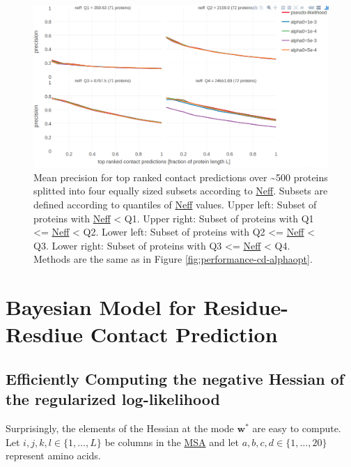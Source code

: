 \documentclass[12pt,a4paper,twoside]{book}
\newcommand{\w}{\mathbf{w}}
\theoremstyle{definition}
\theoremstyle{definition}
\theoremstyle{remark}
\begin{document}
\begin{figure}

{\centering \includegraphics[width=0.9\linewidth]{img/full_likelihood/alpha_opt_precision_vs_rank_facetted_by_neff_notitle} 

}

\caption{Mean precision for top ranked
contact predictions over \textasciitilde{}500 proteins splitted into
four equally sized subsets according to
\protect\hyperlink{abbrev}{Neff}. Subsets are defined according to
quantiles of \protect\hyperlink{abbrev}{Neff} values. Upper left: Subset
of proteins with \protect\hyperlink{abbrev}{Neff} \textless{} Q1. Upper
right: Subset of proteins with Q1 \textless{}=
\protect\hyperlink{abbrev}{Neff} \textless{} Q2. Lower left: Subset of
proteins with Q2 \textless{}= \protect\hyperlink{abbrev}{Neff}
\textless{} Q3. Lower right: Subset of proteins with Q3 \textless{}=
\protect\hyperlink{abbrev}{Neff} \textless{} Q4. Methods are the same as
in Figure \ref{fig:performance-cd-alphaopt}.}\label{fig:performance-cd-alphaopt-neff}
\end{figure}

\section{Bayesian Model for Residue-Resdiue Contact
Prediction}\label{bayesian-model-for-residue-resdiue-contact-prediction}

\subsection{Efficiently Computing the negative Hessian of the
regularized log-likelihood}\label{neg-Hessian-computation}

Surprisingly, the elements of the Hessian at the mode \(\w^*\) are easy
to compute. Let \(i,j,k,l \in \{1,\ldots,L\}\) be columns in the
\protect\hyperlink{abbrev}{MSA} and let
\(a, b, c, d \in \{1,\ldots,20\}\) represent amino acids.
\end{document}
